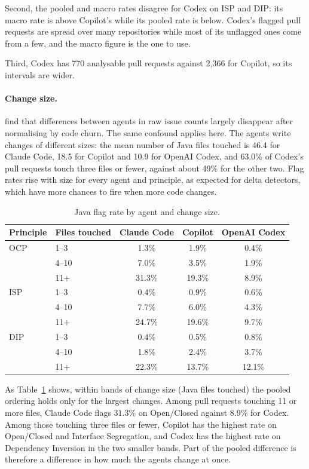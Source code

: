 Second, the pooled and macro rates disagree for Codex on ISP and DIP: its macro rate is above
Copilot's while its pooled rate is below. Codex's flagged pull requests are spread over many
repositories while most of its unflagged ones come from a few, and the macro figure is the one to
use.

Third, Codex has 770 analysable pull requests against 2{,}366 for Copilot, so its intervals are
wider.

\paragraph{Change size.} \citet{cynthia2026postmerge} find that differences between agents in raw
issue counts largely disappear after normalising by code churn. The same confound applies here. The
agents write changes of different sizes: the mean number of Java files touched is 46.4 for Claude
Code, 18.5 for Copilot and 10.9 for OpenAI Codex, and 63.0\% of Codex's pull requests touch three
files or fewer, against about 49\% for the other two. Flag rates rise with size for every agent and
principle, as expected for delta detectors, which have more chances to fire when more code changes.

\begin{table}[htb]
\centering
\caption{Java flag rate by agent and change size.}
\label{tab:size-control}
\begin{tabular}{@{}llccc@{}}
\toprule
\textbf{Principle} & \textbf{Files touched} & \textbf{Claude Code} & \textbf{Copilot} &
\textbf{OpenAI Codex} \\
\midrule
OCP & 1--3   &  1.3\% &  1.9\% &  0.4\% \\
    & 4--10  &  7.0\% &  3.5\% &  1.9\% \\
    & 11+    & 31.3\% & 19.3\% &  8.9\% \\
\midrule
ISP & 1--3   &  0.4\% &  0.9\% &  0.6\% \\
    & 4--10  &  7.7\% &  6.0\% &  4.3\% \\
    & 11+    & 24.7\% & 19.6\% &  9.7\% \\
\midrule
DIP & 1--3   &  0.4\% &  0.5\% &  0.8\% \\
    & 4--10  &  1.8\% &  2.4\% &  3.7\% \\
    & 11+    & 22.3\% & 13.7\% & 12.1\% \\
\bottomrule
\end{tabular}
\end{table}

As Table~\ref{tab:size-control} shows, within bands of change size (Java files touched) the pooled
ordering holds only for the largest changes. Among pull requests touching 11 or more files, Claude Code flags
31.3\% on Open/Closed against 8.9\% for Codex. Among those touching three files or fewer, Copilot has
the highest rate on Open/Closed and Interface Segregation, and Codex has the highest rate on
Dependency Inversion in the two smaller bands. Part of the pooled difference is therefore a
difference in how much the agents change at once.

